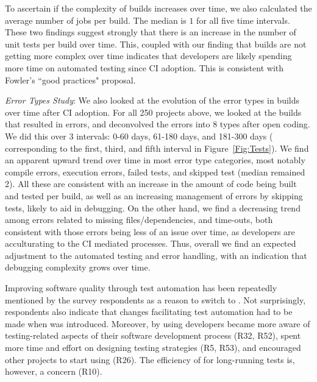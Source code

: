 To ascertain if the complexity of builds increases over time, we also calculated 
the average number of jobs per build.
The median is $1$ for all five time intervals.
These two findings suggest strongly that there is an increase in the number of 
unit tests per build over time.
This, coupled with our finding that builds are not getting more complex over time 
indicates that developers are likely spending more time on automated testing 
since CI adoption.
This is consistent with Fowler's ``good practices" proposal.

\smallskip\noindent \emph{Error Types Study}:
We also looked at the evolution of the error types in builds over time after CI 
adoption.
For all 250 projects above, we looked at the builds that resulted in errors, 
and deconvolved the errors into 8 types after open coding.
We did this over 3 intervals: 0-60 days, 61-180 days, and 181-300 days (\ie 
corresponding to the first, third, and fifth interval in Figure~\ref{Fig:Tests}).
We find an apparent upward trend over time in most error type categories, 
most notably compile errors, execution errors, failed tests, and skipped 
test (median remained 2).
All these are consistent with an increase in the amount of code being built 
and tested per build, as well as an increasing management of errors by 
skipping tests, likely to aid in debugging.
On the other hand, we find a decreasing trend among errors related to missing 
files/dependencies, and time-outs, both consistent with those errors being less 
of an issue over time, as developers are acculturating to the CI mediated 
processes.
Thus, overall we find an expected adjustment to the automated testing and 
error handling, with an indication that debugging complexity grows over time.




Improving software quality through test automation has been repeatedly mentioned 
by the survey respondents as a reason to switch to \Tvis. 
Not surprisingly, respondents also indicate that changes facilitating test automation 
had to be made when \Tvis was introduced. 
Moreover, by using \Tvis developers became more aware of testing-related aspects 
of their software development process (R32, R52), spent more time and effort on 
designing testing strategies (R5, R53), and encouraged other projects to start using 
\Tvis (R26).
The efficiency of \Tvis for long-running tests is, however, a concern (R10).

